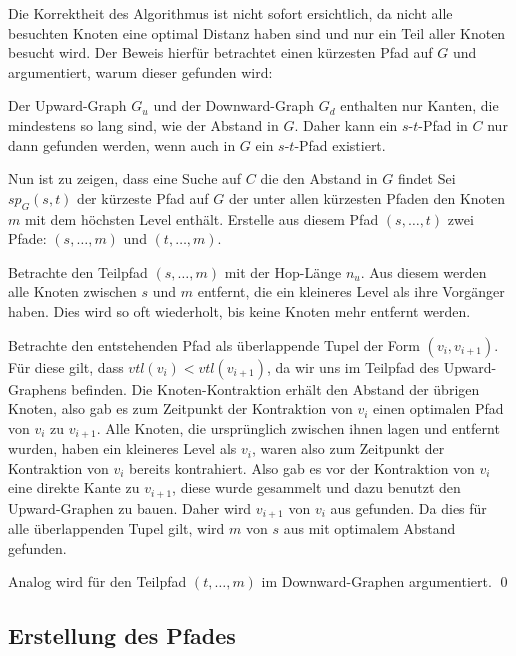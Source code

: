Die Korrektheit des Algorithmus ist nicht sofort ersichtlich, da nicht alle besuchten Knoten eine optimal Distanz haben sind und nur ein Teil aller Knoten besucht wird.
Der Beweis hierfür betrachtet einen kürzesten Pfad auf $G$ und argumentiert, warum dieser gefunden wird:

\begin{beweis}\label{ch:proof:correct}
  Der Upward-Graph $G_u$ und der Downward-Graph $G_d$ enthalten nur Kanten, die mindestens so lang sind, wie der Abstand in $G$.
  Daher kann ein $s$-$t$-Pfad in $C$ nur dann gefunden werden, wenn auch in $G$ ein $s$-$t$-Pfad existiert.

  Nun ist zu zeigen, dass eine Suche auf $C$ die den Abstand in $G$ findet
  Sei ${sp}_G(s, t)$ der kürzeste Pfad auf $G$ der unter allen kürzesten Pfaden den Knoten $m$ mit dem höchsten Level enthält.
  Erstelle aus diesem Pfad $(s, \dotsc, t)$ zwei Pfade: $(s, \dotsc, m)$ und $(t, \dotsc, m)$.

  Betrachte den Teilpfad $(s, \dotsc, m)$ mit der Hop-Länge $n_u$.
  Aus diesem werden alle Knoten zwischen $s$ und $m$ entfernt, die ein kleineres Level als ihre Vorgänger haben.
  Dies wird so oft wiederholt, bis keine Knoten mehr entfernt werden.

  Betrachte den entstehenden Pfad als überlappende Tupel der Form $(v_{i}, v_{i + 1})$.
  Für diese gilt, dass ${vtl}(v_i) < {vtl}(v_{i + 1})$, da wir uns im Teilpfad des Upward-Graphens befinden.
  Die Knoten-Kontraktion erhält den Abstand der übrigen Knoten, also gab es zum Zeitpunkt der Kontraktion von $v_i$ einen optimalen Pfad von $v_i$ zu $v_{i + 1}$.
  Alle Knoten, die ursprünglich zwischen ihnen lagen und entfernt wurden, haben ein kleineres Level als $v_i$, waren also zum Zeitpunkt der Kontraktion von $v_i$ bereits kontrahiert.
  Also gab es vor der Kontraktion von $v_i$ eine direkte Kante zu $v_{i + 1}$, diese wurde gesammelt und dazu benutzt den Upward-Graphen zu bauen.
  Daher wird $v_{i + 1}$ von $v_i$ aus gefunden.
  Da dies für alle überlappenden Tupel gilt, wird $m$ von $s$ aus mit optimalem Abstand gefunden.

  Analog wird für den Teilpfad $(t, \dotsc, m)$ im Downward-Graphen argumentiert.
  \qed
\end{beweis}

\subsection{Erstellung des Pfades}\label{ch:subsection:pfad_gewinnung}

